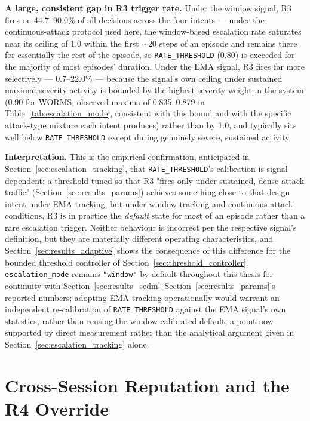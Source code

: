 \textbf{A large, consistent gap in R3 trigger rate.} Under the window
signal, R3 fires on 44.7--90.0\% of all decisions across the four intents —
under the continuous-attack protocol used here, the window-based escalation
rate saturates near its ceiling of 1.0 within the first $\sim$20 steps of an
episode and remains there for essentially the rest of the episode, so
\texttt{RATE\_THRESHOLD} (0.80) is exceeded for the majority of most
episodes' duration. Under the EMA signal, R3 fires far more selectively —
0.7--22.0\% — because the signal's own ceiling under sustained
maximal-severity activity is bounded by the highest severity weight in the
system (0.90 for WORMS; observed maxima of 0.835--0.879 in
Table~\ref{tab:escalation_mode}, consistent with this bound and with the
specific attack-type mixture each intent produces) rather than by 1.0, and
typically sits well below \texttt{RATE\_THRESHOLD} except during genuinely
severe, sustained activity.

\textbf{Interpretation.} This is the empirical confirmation, anticipated in
Section~\ref{sec:escalation_tracking}, that \texttt{RATE\_THRESHOLD}'s
calibration is signal-dependent: a threshold tuned so that R3 "fires only
under sustained, dense attack traffic" (Section~\ref{sec:results_params})
achieves something close to that design intent under EMA tracking, but
under window tracking and continuous-attack conditions, R3 is in practice
the \emph{default} state for most of an episode rather than a rare
escalation trigger. Neither behaviour is incorrect per the respective
signal's definition, but they are materially different operating
characteristics, and Section~\ref{sec:results_adaptive} shows the
consequence of this difference for the bounded threshold controller of
Section~\ref{sec:threshold_controller}. \texttt{escalation\_mode} remains
\texttt{"window"} by default throughout this thesis for continuity with
Section~\ref{sec:results_sedm}--Section~\ref{sec:results_params}'s reported
numbers; adopting EMA tracking operationally would warrant an independent
re-calibration of \texttt{RATE\_THRESHOLD} against the EMA signal's own
statistics, rather than reusing the window-calibrated default, a point now
supported by direct measurement rather than the analytical argument given
in Section~\ref{sec:escalation_tracking} alone.

\section{Cross-Session Reputation and the R4 Override}
\label{sec:results_reputation}


